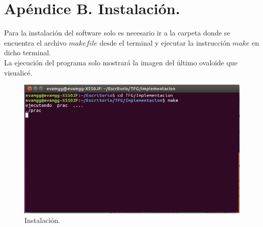 \chapter{Apéndice B. Instalación.}

Para la instalación del software solo es necesario ir a la carpeta donde se encuentra el archivo $makefile$ desde el terminal y ejecutar la instrucción $make$ en dicho terminal.
${ }$\\

La ejecución del programa solo mostrará la imagen del último ovaloide que visualicé.
${ }$\\

\begin{figure}[h]
	\begin{center}
		\includegraphics[width=1.0\textwidth]{imagenes/instalacion.png}
	\end{center}
	\caption{Instalación.}
	\label{fig:etiq_41}
\end{figure}